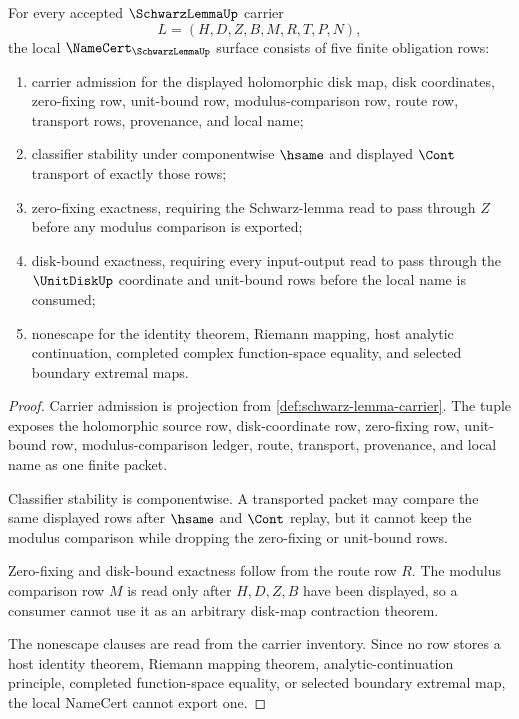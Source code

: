 \begin{theorem}
\label{thm:schwarz-lemma-namecert-obligations}
For every accepted $\SchwarzLemmaUp$ carrier
$$
L=(H,D,Z,B,M,R,T,P,N),
$$
the local $\NameCert_{\SchwarzLemmaUp}$ surface consists of five finite obligation rows:
\begin{enumerate}
\item carrier admission for the displayed holomorphic disk map, disk coordinates, zero-fixing row, unit-bound row, modulus-comparison row, route row, transport rows, provenance, and local name;
\item classifier stability under componentwise $\hsame$ and displayed $\Cont$ transport of exactly those rows;
\item zero-fixing exactness, requiring the Schwarz-lemma read to pass through $Z$ before any modulus comparison is exported;
\item disk-bound exactness, requiring every input-output read to pass through the $\UnitDiskUp$ coordinate and unit-bound rows before the local name is consumed;
\item nonescape for the identity theorem, Riemann mapping, host analytic continuation, completed complex function-space equality, and selected boundary extremal maps.
\end{enumerate}
\end{theorem}
\begin{proof}
Carrier admission is projection from \autoref{def:schwarz-lemma-carrier}. The tuple exposes the holomorphic source row, disk-coordinate row, zero-fixing row, unit-bound row, modulus-comparison ledger, route, transport, provenance, and local name as one finite packet.

Classifier stability is componentwise. A transported packet may compare the same displayed rows after $\hsame$ and $\Cont$ replay, but it cannot keep the modulus comparison while dropping the zero-fixing or unit-bound rows.

Zero-fixing and disk-bound exactness follow from the route row $R$. The modulus comparison row $M$ is read only after $H,D,Z,B$ have been displayed, so a consumer cannot use it as an arbitrary disk-map contraction theorem.

The nonescape clauses are read from the carrier inventory. Since no row stores a host identity theorem, Riemann mapping theorem, analytic-continuation principle, completed function-space equality, or selected boundary extremal map, the local NameCert cannot export one.
\end{proof}

